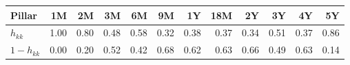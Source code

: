 {\footnotesize\setlength{\tabcolsep}{4pt}\begin{tabular}{lrrrrrrrrrrr}
\toprule
Pillar & 1M & 2M & 3M & 6M & 9M & 1Y & 18M & 2Y & 3Y & 4Y & 5Y \\
\midrule
$h_{kk}$ & \num{1.00} & \num{0.80} & \num{0.48} & \num{0.58} & \num{0.32} & \num{0.38} & \num{0.37} & \num{0.34} & \num{0.51} & \num{0.37} & \num{0.86} \\
$1-h_{kk}$ & \num{0.00} & \num{0.20} & \num{0.52} & \num{0.42} & \num{0.68} & \num{0.62} & \num{0.63} & \num{0.66} & \num{0.49} & \num{0.63} & \num{0.14} \\
\bottomrule
\end{tabular}}
